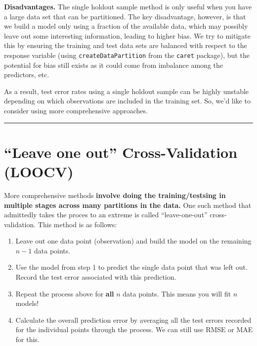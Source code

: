 \documentclass[
]{book}
\providecommand{\tightlist}{%
  \setlength{\itemsep}{0pt}\setlength{\parskip}{0pt}}
\begin{document}
\textbf{Disadvantages.} The single holdout sample method is only useful when you have a large data set that can be partitioned. The key disadvantage, however, is that we build a model only using a fraction of the available data, which may possibly leave out some interesting information, leading to higher bias. We try to mitigate this by ensuring the training and test data sets are balanced with respect to the response variable (using \texttt{createDataPartition} from the \texttt{caret} package), but the potential for bias still exists as it could come from imbalance among the predictors, etc.

As a result, test error rates using a single holdout sample can be highly unstable depending on which observations are included in the training set. So, we'd like to consider using more comprehensive approaches.

\begin{center}\rule{0.5\linewidth}{0.5pt}\end{center}

\hypertarget{leave-one-out-cross-validation-loocv}{%
\section{``Leave one out'' Cross-Validation (LOOCV)}\label{leave-one-out-cross-validation-loocv}}

More comprehensive methods \textbf{involve doing the training/testsing in multiple stages across many partitions in the data.} One such method that admittedly takes the proces to an extreme is called ``leave-one-out'' cross-validation. This method is as follows:

\begin{enumerate}
\def\labelenumi{\arabic{enumi}.}
\tightlist
\item
  Leave out one data point (observation) and build the model on the remaining \(n-1\) data points.
\item
  Use the model from step 1 to predict the single data point that was left out. Record the test error associated with this prediction.
\item
  Repeat the process above for \textbf{all} \(n\) data points. This means you will fit \(n\) models!
\item
  Calculate the overall prediction error by averaging all the test errors recorded for the individual points through the process. We can still use RMSE or MAE for this.
\end{enumerate}
\end{document}
